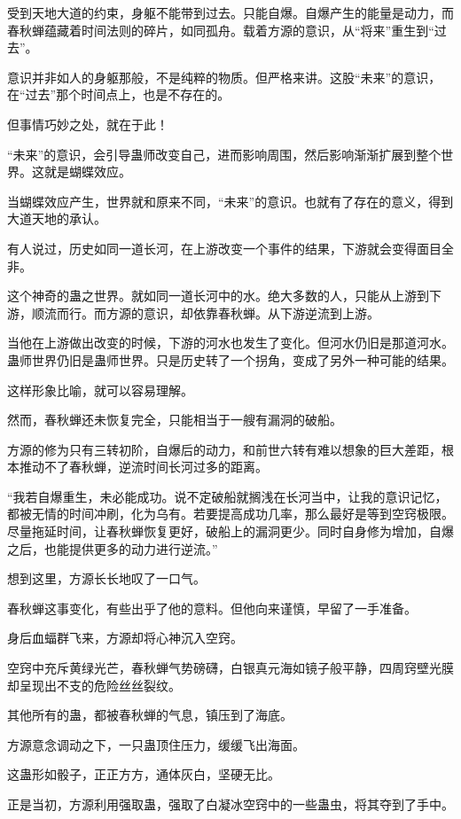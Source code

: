 \begin{this_body}
受到天地大道的约束，身躯不能带到过去。只能自爆。自爆产生的能量是动力，而春秋蝉蕴藏着时间法则的碎片，如同孤舟。载着方源的意识，从“将来”重生到“过去”。

意识并非如人的身躯那般，不是纯粹的物质。但严格来讲。这股“未来”的意识，在“过去”那个时间点上，也是不存在的。

但事情巧妙之处，就在于此！

“未来”的意识，会引导蛊师改变自己，进而影响周围，然后影响渐渐扩展到整个世界。这就是蝴蝶效应。

当蝴蝶效应产生，世界就和原来不同，“未来”的意识。也就有了存在的意义，得到大道天地的承认。

有人说过，历史如同一道长河，在上游改变一个事件的结果，下游就会变得面目全非。

这个神奇的蛊之世界。就如同一道长河中的水。绝大多数的人，只能从上游到下游，顺流而行。而方源的意识，却依靠春秋蝉。从下游逆流到上游。

当他在上游做出改变的时候，下游的河水也发生了变化。但河水仍旧是那道河水。蛊师世界仍旧是蛊师世界。只是历史转了一个拐角，变成了另外一种可能的结果。

这样形象比喻，就可以容易理解。

然而，春秋蝉还未恢复完全，只能相当于一艘有漏洞的破船。

方源的修为只有三转初阶，自爆后的动力，和前世六转有难以想象的巨大差距，根本推动不了春秋蝉，逆流时间长河过多的距离。

“我若自爆重生，未必能成功。说不定破船就搁浅在长河当中，让我的意识记忆，都被无情的时间冲刷，化为乌有。若要提高成功几率，那么最好是等到空窍极限。尽量拖延时间，让春秋蝉恢复更好，破船上的漏洞更少。同时自身修为增加，自爆之后，也能提供更多的动力进行逆流。”

想到这里，方源长长地叹了一口气。

春秋蝉这事变化，有些出乎了他的意料。但他向来谨慎，早留了一手准备。

身后血蝠群飞来，方源却将心神沉入空窍。

空窍中充斥黄绿光芒，春秋蝉气势磅礴，白银真元海如镜子般平静，四周窍壁光膜却呈现出不支的危险丝丝裂纹。

其他所有的蛊，都被春秋蝉的气息，镇压到了海底。

方源意念调动之下，一只蛊顶住压力，缓缓飞出海面。

这蛊形如骰子，正正方方，通体灰白，坚硬无比。

正是当初，方源利用强取蛊，强取了白凝冰空窍中的一些蛊虫，将其夺到了手中。


\end{this_body}
